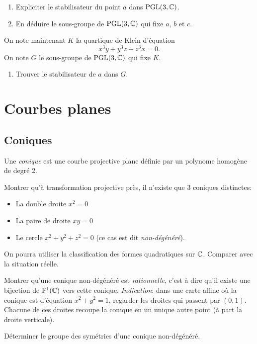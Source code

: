 \begin{enumerate}
	\item Expliciter le stabilisateur du point
		$ a $
		dans
		$ \mathrm{PGL}(3, \mathbb{C}) $.
	\item En déduire le sous-groupe de
		$ \mathrm{PGL}(3, \mathbb{C}) $
		qui fixe $a $, $ b $ et $ c $.
\end{enumerate}

On note maintenant $ K $
la quartique de Klein d'équation
\begin{equation}
	\label{eq:klein}
	x^3 y
	+
	y^3 z
	+
	z^3 x
	= 0
	.
\end{equation}
On note $ G $
le sous-groupe de
$ \mathrm{PGL}(3, \mathbb{C}) $
qui fixe $ K $.

\begin{enumerate}
	\item Trouver le stabilisateur de $ a $ dans $ G $.
\end{enumerate}


\section{Courbes planes}
\label{sec:courbes_planes}

\subsection{Coniques}
\label{sub:coniques}

Une \emph{conique} est une courbe projective plane
définie par un polynome homogène de degré 2.

Montrer qu'à transformation projective près, il n'existe que
3 coniques distinctes: 
\begin{itemize}
	\item La double droite $ x^2 = 0 $
	\item La paire de droite $ xy = 0 $
	\item Le cercle $ x^2+y^2+z^2=0 $
		(ce cas est dit \emph{non-dégénéré}).
\end{itemize}
On pourra utiliser la classification des formes quadratiques sur
$ \mathbb{C} $.
Comparer avec la situation réelle.

Montrer qu'une conique non-dégénéré est \emph{rationnelle},
c'est à dire qu'il existe une bijection
de $ \mathbb{P}^1 (\mathbb{C}) $ vers cette conique.
\emph{Indication}: dans une carte affine où la conique est d'équation
$ x^2+y^2=1 $, regarder les droites qui passent par $ (0,1) $.
Chacune de ces droites recoupe la conique en un unique autre point 
(à part la droite verticale).

Déterminer le groupe des symétries d'une conique non-dégénéré.


